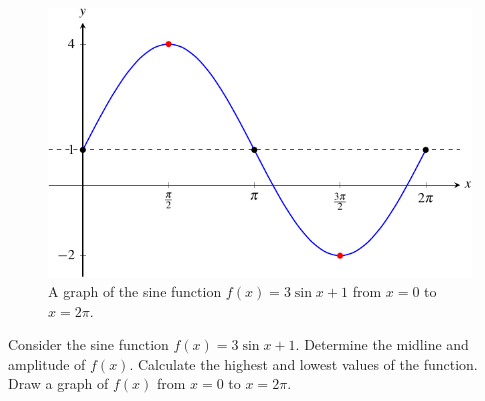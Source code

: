 \documentclass[a4paper,oneside,12pt]{article}
\begin{document}
\begin{figure}[!htbp]
\centering
\includegraphics[scale=1.1]{image/13/3-sin-1.pdf}
\caption{%
  A graph of the sine function $f(x) = 3 \sin x + 1$ from $x = 0$ to
  $x = 2\pi$.
}
\label{fig:trigonometric:sine_3_sin_1}
\end{figure}

\begin{example}
Consider the sine function $f(x) = 3 \sin x + 1$.  Determine the
midline and amplitude of $f(x)$.  Calculate the highest and lowest
values of the function.  Draw a graph of $f(x)$ from $x = 0$ to
$x = 2\pi$.
\end{example}
\end{document}
